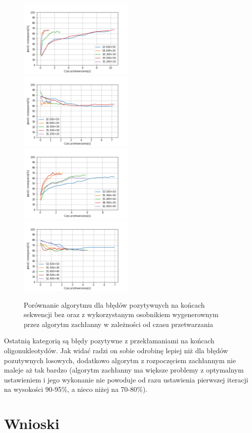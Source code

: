 \documentclass{article}
\begin{document}
\begin{figure}[H]
\includegraphics[width=0.5\textwidth]{Czaspoz-oli1.png}
\includegraphics[width=0.5\textwidth]{Czaspoz-oli-greedy1.png}
\includegraphics[width=0.5\textwidth]{Czaspoz-oli2.png}
\includegraphics[width=0.5\textwidth]{Czaspoz-oli-greedy2.png}
\caption{Porównanie algorytmu dla błędów pozytywnych na końcach sekwencji bez oraz z wykorzystanym osobnikiem wygenerownym przez algorytm zachłanny w zależności od czasu przetwarzania}
\end{figure}
Ostatnią kategorią są błędy pozytywne z przekłamaniami na końcach oligonukleotydów. Jak widać radzi on sobie odrobinę lepiej niż dla błędów pozutywnych losowych, dodatkowo algorytm z rozpoczęciem zachłannym nie maleje aż tak bardzo (algorytm zachłanny ma większe problemy z optymalnym ustawieniem i jego wykonanie nie powoduje od razu ustawienia pierwszej iteracji na wysokości 90-95\%, a nieco niżej na 70-80\%).
\section{Wnioski}
\end{document}
